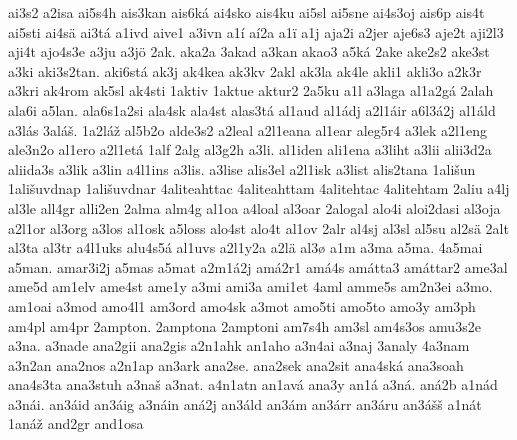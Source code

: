 {    ai3s2
    a2isa
    ai5s4h
    ais3kan
    ais6ká
    ai4sko
    ais4ku
    ai5sl
    ai5sne
    ai4s3oj
    ais6p
    ais4t
    ai5sti
    ai4sä
    ai3tá
    a1ivd
    aive1
    a3ivn
    a1í
    aí2a
    a1ï
    a1j
    aja2i
    a2jer
    aje6s3
    aje2t
    aji2l3
    aji4t
    ajo4s3e
    a3ju
    a3jö
    2ak.
    aka2a
    3akad
    a3kan
    akao3
    a5ká
    2ake
    ake2s2
    ake3st
    a3ki
    aki3s2tan.
    aki6stá
    ak3j
    ak4kea
    ak3kv
    2akl
    ak3la
    ak4le
    akli1
    akli3o
    a2k3r
    a3kri
    ak4rom
    ak5sl
    ak4sti
    1aktiv
    1aktue
    aktur2
    2a5ku
    a1l
    a3laga
    al1a2gá
    2alah
    ala6i
    a5lan.
    ala6s1a2si
    ala4sk
    ala4st
    alas3tá
    al1aud
    al1ádj
    a2l1áir
    a6l3á2j
    al1áld
    a3lás
    3aláš.
    1a2láž
    al5b2o
    alde3s2
    a2leal
    a2l1eana
    al1ear
    aleg5r4
    a3lek
    a2l1eng
    ale3n2o
    al1ero
    a2l1etá
    1alf
    2alg
    al3g2h
    a3li.
    al1iden
    ali1ena
    a3liht
    a3lii
    alii3d2a
    aliida3s
    a3lik
    a3lin
    a4l1ins
    a3lis.
    a3lise
    alis3el
    a2l1isk
    a3list
    alis2tana
    1ališun
    1ališuvdnap
    1ališuvdnar
    4aliteahttac
    4aliteahttam
    4alitehtac
    4alitehtam
    2aliu
    a4lj
    al3le
    all4gr
    alli2en
    2alma
    alm4g
    al1oa
    a4loal
    al3oar
    2alogal
    alo4i
    aloi2dasi
    al3oja
    a2l1or
    al3org
    a3los
    al1osk
    a5loss
    alo4st
    alo4t
    al1ov
    2alr
    al4sj
    al3sl
    al5su
    al2sä
    2alt
    al3ta
    al3tr
    a4l1uks
    alu4s5á
    al1uvs
    a2l1y2a
    a2lä
    al3ø
    a1m
    a3ma
    a5ma.
    4a5mai
    a5man.
    amar3i2j
    a5mas
    a5mat
    a2m1á2j
    amá2r1
    amá4s
    amátta3
    amáttar2
    ame3al
    ame5d
    am1elv
    ame4st
    ame1y
    a3mi
    ami3a
    ami1et
    4aml
    amme5s
    am2n3ei
    a3mo.
    am1oai
    a3mod
    amo4l1
    am3ord
    amo4sk
    a3mot
    amo5ti
    amo5to
    amo3y
    am3ph
    am4pl
    am4pr
    2ampton.
    2amptona
    2amptoni
    am7s4h
    am3sl
    am4s3os
    amu3s2e
    a3na.
    a3nade
    ana2gii
    ana2gis
    a2n1ahk
    an1aho
    a3n4ai
    a3naj
    3analy
    4a3nam
    a3n2an
    ana2nos
    a2n1ap
    an3ark
    ana2se.
    ana2sek
    ana2sit
    ana4ská
    ana3soah
    ana4s3ta
    ana3stuh
    a3naš
    a3nat.
    a4n1atn
    an1avá
    ana3y
    an1á
    a3ná.
    aná2b
    a1nád
    a3nái.
    an3áid
    an3áig
    a3náin
    aná2j
    an3áld
    an3ám
    an3árr
    an3áru
    an3ášš
    a1nát
    1anáž
    and2gr
    and1osa
}
